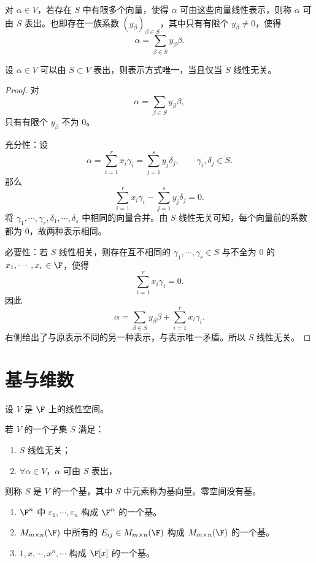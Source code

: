 \begin{definition}\label{p1:concept:c4-l177}
	对 $\alpha\in V$，若存在 $S$ 中有限多个向量，使得 $\alpha$ 可由这些向量线性表示，则称 $\alpha$ 可由 $S$ 表出。也即存在一族系数 $(y_\beta)_{\beta\in S}$，其中只有有限个 $y_\beta\neq0$，使得
	\[
	\alpha=\sum_{\beta\in S}y_\beta\beta.
	\]
\end{definition}

\begin{proposition}
	设 $\alpha\in V$ 可以由 $S\subset V$ 表出，则表示方式唯一，当且仅当 $S$ 线性无关。
\end{proposition}

\begin{proof}
	对
	\[
	\alpha=\sum_{\beta\in S}y_\beta\beta,
	\]
	只有有限个 $y_\beta$ 不为 $0$。
	
	充分性：设
	\[
	\alpha=\sum_{i=1}^{r}x_i\gamma_i
	=\sum_{j=1}^{s}y_j\delta_j,
	\qquad
	\gamma_i,\delta_j\in S.
	\]
	那么
	\[
	\sum_{i=1}^{r}x_i\gamma_i-
	\sum_{j=1}^{s}y_j\delta_j=0.
	\]
	将 $\gamma_1,\cdots,\gamma_r,\delta_1,\cdots,\delta_s$ 中相同的向量合并。由 $S$ 线性无关可知，每个向量前的系数都为 $0$，故两种表示相同。
	
	必要性：若 $S$ 线性相关，则存在互不相同的 $\gamma_1,\cdots,\gamma_r\in S$ 与不全为 $0$ 的 $x_1,\cdots,x_r\in\F$，使得
	\[
	\sum_{i=1}^{r}x_i\gamma_i=0.
	\]
	因此
	\[
	\alpha=
	\sum_{\beta\in S}y_\beta\beta
	+
	\sum_{i=1}^{r}x_i\gamma_i.
	\]
	右侧给出了与原表示不同的另一种表示，与表示唯一矛盾。所以 $S$ 线性无关。
\end{proof}

\section{基与维数}

设 $V$ 是 $\F$ 上的线性空间。

\begin{definition}\label{p1:concept:c4-l227}
	若 $V$ 的一个子集 $S$ 满足：
	\begin{enumerate}
		\item $S$ 线性无关；
		\item $\forall \alpha\in V$，$\alpha$ 可由 $S$ 表出，
	\end{enumerate}
	则称 $S$ 是 $V$ 的一个基，其中 $S$ 中元素称为基向量。零空间没有基。
\end{definition}

\begin{example}
	\begin{enumerate}
		\item $\F^n$ 中 $\varepsilon_1,\cdots,\varepsilon_n$ 构成 $\F^n$ 的一个基。
		\item $M_{m\times n}(\F)$ 中所有的 $E_{ij}\in M_{m\times n}(\F)$ 构成 $M_{m\times n}(\F)$ 的一个基。
		\item $1,x,\cdots,x^n,\cdots$ 构成 $\F[x]$ 的一个基。
	\end{enumerate}
\end{example}

